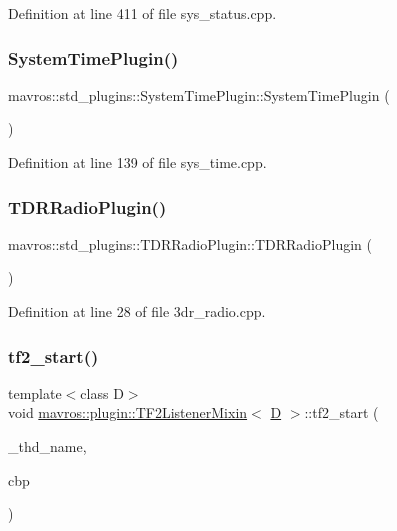Definition at line 411 of file sys\+\_\+status.\+cpp.

\mbox{\label{group__plugin_ga34c7a6c4d0439bf12c630ffcbeef66c9}} 
\subsubsection{\texorpdfstring{SystemTimePlugin()}{SystemTimePlugin()}}
{\footnotesize\ttfamily mavros\+::std\+\_\+plugins\+::\+System\+Time\+Plugin\+::\+System\+Time\+Plugin (\begin{DoxyParamCaption}{ }\end{DoxyParamCaption})\hspace{0.3cm}{\ttfamily [inline]}}



Definition at line 139 of file sys\+\_\+time.\+cpp.

\mbox{\label{group__plugin_ga8a69ef6d9829f0c1993c6b7737606106}} 
\subsubsection{\texorpdfstring{TDRRadioPlugin()}{TDRRadioPlugin()}}
{\footnotesize\ttfamily mavros\+::std\+\_\+plugins\+::\+T\+D\+R\+Radio\+Plugin\+::\+T\+D\+R\+Radio\+Plugin (\begin{DoxyParamCaption}{ }\end{DoxyParamCaption})\hspace{0.3cm}{\ttfamily [inline]}}



Definition at line 28 of file 3dr\+\_\+radio.\+cpp.

\mbox{\label{group__plugin_ga900fbf118417e6308394b803276bd257}} 
\subsubsection{\texorpdfstring{tf2\_start()}{tf2\_start()}\hspace{0.1cm}{\footnotesize\ttfamily [1/2]}}
{\footnotesize\ttfamily template$<$class D$>$ \\
void \mbox{\hyperlink{classmavros_1_1plugin_1_1TF2ListenerMixin}{mavros\+::plugin\+::\+T\+F2\+Listener\+Mixin}}$<$ \mbox{\hyperlink{mavlink__sha256_8h_af316c33cc298530f245e8b55330e86b5}{D}} $>$\+::tf2\+\_\+start (\begin{DoxyParamCaption}\item[{const char $\ast$}]{\+\_\+thd\+\_\+name,  }\item[{void(D\+::$\ast$)(const geometry\+\_\+msgs\+::\+Transform\+Stamped \&)}]{cbp }\end{DoxyParamCaption})\hspace{0.3cm}{\ttfamily [inline]}}



